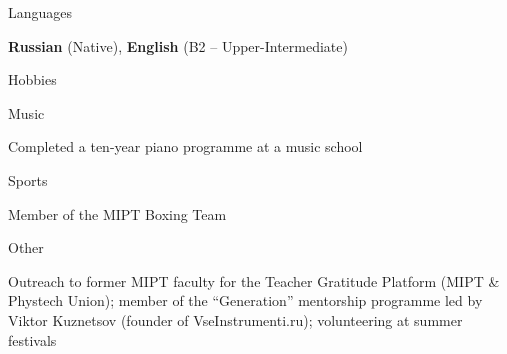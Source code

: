 \documentclass[10pt,a4paper]{article}
\newlength{\datecol}\setlength{\datecol}{2.3cm}
\newcommand{\cvsection}[1]{%
  \vspace{3pt}%
  \noindent\makebox[\datecol][r]{\color{accent}\rule[0.25ex]{\datecol}{3pt}}\hspace{6pt}%
  {\color{accent}\Large #1}\par\vspace{2pt}}
\newlength{\bodycol}
\newcommand{\cventry}[2]{%
  \setlength{\bodycol}{\dimexpr\linewidth-\datecol-6pt\relax}%
  \noindent\parbox[t]{\datecol}{\raggedleft\small\strut #1}\hspace{6pt}%
  \parbox[t]{\bodycol}{\strut #2}\par\vspace{2pt}}
\begin{document}
\cvsection{Languages}
\cventry{}{\textbf{Russian} (Native), \textbf{English} (B2 -- Upper-Intermediate)}

\cvsection{Hobbies}
\cventry{Music}{Completed a ten-year piano programme at a music school}
\cventry{Sports}{Member of the MIPT Boxing Team}
\cventry{Other}{Outreach to former MIPT faculty for the Teacher Gratitude Platform (MIPT \& Phystech Union); member of the ``Generation'' mentorship programme led by Viktor Kuznetsov (founder of VseInstrumenti.ru); volunteering at summer festivals}
\end{document}
